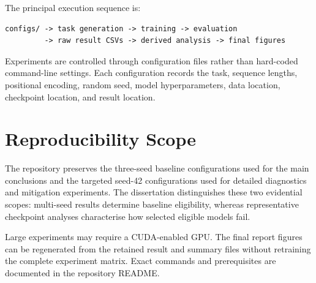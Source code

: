 \documentclass[
    author={Aanchala Ravindra Bhongade},
    supervisor={Dr. Fernando Moreno-Pino},
    degree={MSc},
    title={Length Generalisation in Transformer-Based Sequence Models: Failure Taxonomy and Mitigation Strategies},
    subtitle={},
    type={},
    year={2026}
]{dissertation}
\begin{document}
The principal execution sequence is:

\begin{verbatim}
configs/ -> task generation -> training -> evaluation
         -> raw result CSVs -> derived analysis -> final figures
\end{verbatim}

Experiments are controlled through configuration files rather than
hard-coded command-line settings. Each configuration records the task, sequence lengths, positional encoding, random seed, model hyperparameters, data location, checkpoint location, and result location.

\section{Reproducibility Scope}

The repository preserves the three-seed baseline configurations used for the main conclusions and the targeted seed-42 configurations used for detailed diagnostics and mitigation experiments. The dissertation distinguishes these two evidential scopes: multi-seed results determine baseline eligibility, whereas representative checkpoint analyses characterise how selected eligible models fail.

Large experiments may require a CUDA-enabled GPU. The final report figures can be regenerated from the retained result and summary files without retraining the complete experiment matrix. Exact commands and prerequisites are documented in the repository README.

\end{document}
